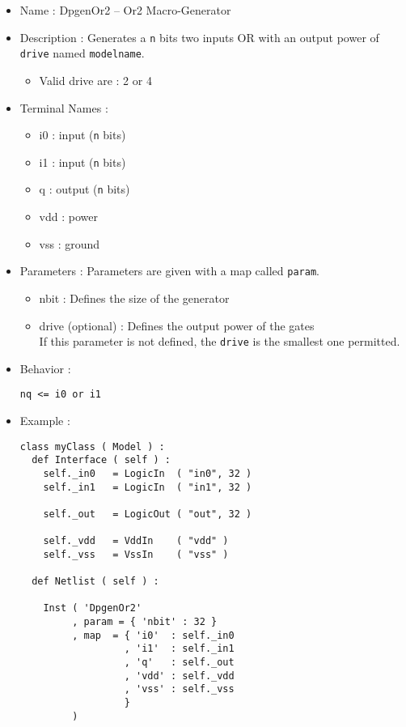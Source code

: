 \begin{itemize}
    \item Name : DpgenOr2 -- Or2 Macro-Generator
    \item Description : Generates a \verb-n- bits two inputs OR with an output power of \verb-drive- named \verb-modelname-.
    \begin{itemize}
        \item Valid drive are : 2 or 4
    \end{itemize}
    \item Terminal Names :
    \begin{itemize}
        \item i0 : input (\verb-n- bits)
        \item i1 : input (\verb-n- bits)
        \item q : output (\verb-n- bits)
        \item vdd : power
        \item vss : ground
    \end{itemize}
    \item Parameters : Parameters are given with a map called \verb-param-.
    \begin{itemize}
        \item nbit : Defines the size of the generator
        \item drive (optional) : Defines the output power of the gates\\If this parameter is not defined, the \verb-drive- is the smallest one permitted.
    \end{itemize}
    \item Behavior :
\begin{verbatim}
nq <= i0 or i1
\end{verbatim}
    \item Example :
\begin{verbatim}
class myClass ( Model ) :
  def Interface ( self ) :
    self._in0   = LogicIn  ( "in0", 32 )
    self._in1   = LogicIn  ( "in1", 32 )
    
    self._out   = LogicOut ( "out", 32 )

    self._vdd   = VddIn    ( "vdd" )
    self._vss   = VssIn    ( "vss" )
    
  def Netlist ( self ) :
      
    Inst ( 'DpgenOr2'
         , param = { 'nbit' : 32 }
         , map  = { 'i0'  : self._in0
                  , 'i1'  : self._in1
                  , 'q'   : self._out
                  , 'vdd' : self._vdd
                  , 'vss' : self._vss
                  }
         )
\end{verbatim}
\end{itemize}
